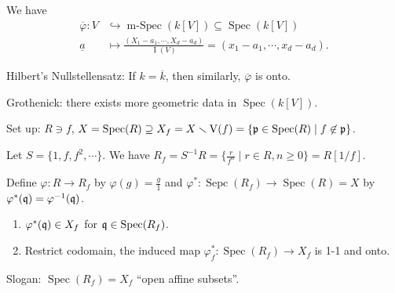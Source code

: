 \begin{construction*}
    We have 
    \begin{align*}
        \overbar \varphi: V &\hookrightarrow \operatorname{m-Spec}(k[V]) \subseteq \operatorname{Spec}(k[V]) \\
        \underline a &\mapsto \frac{(X_1-a_1,\cdots,X_d-a_d)}{\operatorname{I}(V)} = (x_1 - a_1,\cdots, x_d - a_d). 
    \end{align*}
    \par Hilbert's Nullstellensatz: If $k = \overbar k$, then similarly, $\overbar \varphi$ is onto. \par 
    Grothenick: there exists more geometric data in $\operatorname{Spec}(k[V])$. 
\end{construction*}

\noindent Set up: $R \ni f$, $X = \operatorname{Spec}(R) \supseteq X_f = X \smallsetminus \operatorname{V}(f) = \{\mathfrak{p} \in \operatorname{Spec}(R) \mid f \not \in \mathfrak{p}\}$.

\begin{recall*}
    Let $S = \{1,f,f^2,\cdots\}$. We have $R_f = S^{-1}R = \{\frac{r}{f^n} \mid r \in R, n \geq 0\} = R[1/f]$.
\end{recall*}

\begin{proposition}\label{2.20}
    Define $\varphi: R \to R_f$ by $\varphi(g) = \frac{g}{1}$ and $\varphi^*: \operatorname{Sepc}(R_f) \to \operatorname{Spec}(R) = X$ by $\varphi^*(\mathfrak{q}) = \varphi^{-1}(\mathfrak{q})$.
    \begin{enumerate}
        \item\label{2.20a} $\varphi^*(\mathfrak{q}) \in X_f$ for $\mathfrak{q} \in \operatorname{Spec}(R_f)$. 
        \item\label{2.20b} Restrict codomain, the induced map $\varphi_f^*: \operatorname{Spec}(R_f) \to X_f$ is 1-1 and onto.
    \end{enumerate}
    Slogan: $\operatorname{Spec}(R_f) = X_f$ ``open affine subsets''.
\end{proposition}

